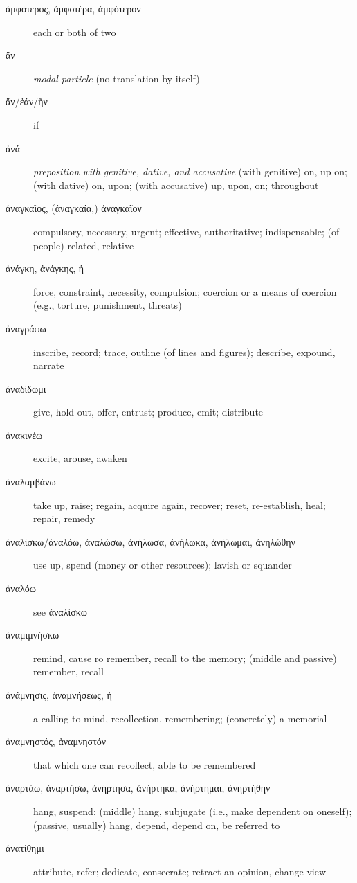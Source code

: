 \documentclass[12pt,letterpaper]{article}
\begin{document}
\begin{description}
    \item[\textgreek{ἀμφότερος, ἀμφοτέρα, ἀμφότερον}] \marginnote{*}each or both of two
    \item[\textgreek{ἄν}] \marginnote{*}\textit{modal particle} (no translation by itself)
    \item[\textgreek{ἄν/ἐάν/ἤν}] \marginnote{*}if
    \item[\textgreek{ἀνά}] \marginnote{*}\textit{preposition with genitive, dative, and accusative} (with genitive) on, up on; (with dative) on, upon; (with accusative) up, upon, on; throughout
    \item[\textgreek{ἀναγκαῖος, (ἀναγκαία,) ἀναγκαῖον}] compulsory, necessary, urgent; effective, authoritative; indispensable; (of people) related, relative
    \item[\textgreek{ἀνάγκη, ἀνάγκης, ἡ}] \marginnote{*}force, constraint, necessity, compulsion; coercion or a means of coercion (e.g., torture, punishment, threats)
    \item[\textgreek{ἀναγράφω}] inscribe, record; trace, outline (of lines and figures); describe, expound, narrate
    \item[\textgreek{ἀναδίδωμι}] give, hold out, offer, entrust; produce, emit; distribute
    \item[\textgreek{ἀνακινέω}] excite, arouse, awaken
    \item[\textgreek{ἀναλαμβάνω}] take up, raise; regain, acquire again, recover; reset, re-establish, heal; repair, remedy
    \item[\textgreek{ἀναλίσκω/ἀναλόω, ἀναλώσω, ἀνήλωσα, ἀνήλωκα, ἀνήλωμαι, ἀνηλώθην}] use up, spend (money or other resources); lavish or squander
    \item[\textgreek{ἀναλόω}] see \textgreek{ἀναλίσκω}
    \item[\textgreek{ἀναμιμνήσκω}] remind, cause ro remember, recall to the memory; (middle and passive) remember, recall
    \item[\textgreek{ἀνάμνησις, ἀναμνήσεως, ἡ}] a calling to mind, recollection, remembering; (concretely) a memorial
    \item[\textgreek{ἀναμνηστός, ἀναμνηστόν}] that which one can recollect, able to be remembered
    \item[\textgreek{ἀναρτάω, ἀναρτήσω, ἀνήρτησα, ἀνήρτηκα, ἀνήρτημαι, ἀνηρτήθην}] hang, suspend; (middle) hang, subjugate (i.e., make dependent on oneself); (passive, usually) hang, depend, depend on, be referred to
    \item[\textgreek{ἀνατίθημι}] attribute, refer; dedicate, consecrate; retract an opinion, change view

\end{description}
\end{document}
